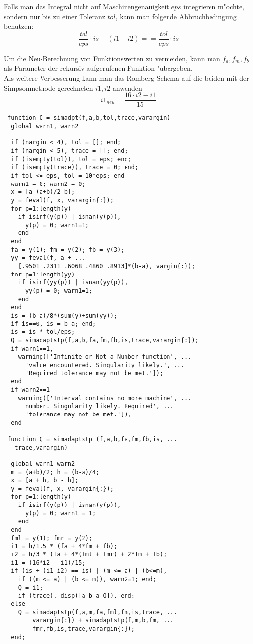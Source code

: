 \documentclass[german, 10pt, a4paper, twocolumn]{scrartcl}
\theoremstyle{definition}
\begin{document}
Falls man das Integral nicht auf Maschinengenauigkeit $eps$ integrieren m"ochte, sondern nur bis zu einer Toleranz $tol$, kann man folgende Abbruchbedingung benutzen:
\begin{displaymath}
	\frac{tol}{eps} \cdotp is + (i1-i2) == \frac{tol}{eps} \cdotp is
\end{displaymath}

Um die Neu-Berechnung von Funktionswerten zu vermeiden, kann man $f_a, f_m, f_b$ als Parameter der rekursiv aufgerufenen Funktion "ubergeben.\\

Als weitere Verbesserung kann man das Romberg-Schema auf die beiden mit der Simpsonmethode gerechneten $i1, i2$ anwenden
\begin{displaymath}
	i1_{neu} = \frac{16\cdotp i2 - i1}{15}
\end{displaymath}

\small
\begin{verbatim}
 function Q = simadpt(f,a,b,tol,trace,varargin)
  global warn1, warn2

  if (nargin < 4), tol = []; end;
  if (nargin < 5), trace = []; end;
  if (isempty(tol)), tol = eps; end;
  if (isempty(trace)), trace = 0; end;
  if tol <= eps, tol = 10*eps; end
  warn1 = 0; warn2 = 0;
  x = [a (a+b)/2 b];
  y = feval(f, x, varargin{:});
  for p=1:length(y)
    if isinf(y(p)) | isnan(y(p)),
      y(p) = 0; warn1=1;
    end
  end
  fa = y(1); fm = y(2); fb = y(3);
  yy = feval(f, a + ...
    [.9501 .2311 .6068 .4860 .8913]*(b-a), vargin{:});
  for p=1:length(yy)
    if isinf(yy(p)) | isnan(yy(p)),
      yy(p) = 0; warn1=1;
    end
  end
  is = (b-a)/8*(sum(y)+sum(yy));
  if is==0, is = b-a; end;
  is = is * tol/eps;
  Q = simadaptstp(f,a,b,fa,fm,fb,is,trace,varargin{:});
  if warn1==1,
    warning(['Infinite or Not-a-Number function', ...
      'value encountered. Singularity likely.', ...
      'Required tolerance may not be met.']);
  end
  if warn2==1
    warning(['Interval contains no more machine', ...
      number. Singularity likely. Required', ...
      'tolerance may not be met.']);
  end

 function Q = simadaptstp (f,a,b,fa,fm,fb,is, ...
   trace,varargin)

  global warn1 warn2
  m = (a+b)/2; h = (b-a)/4;
  x = [a + h, b - h];
  y = feval(f, x, varargin{:});
  for p=1:length(y)
    if isinf(y(p)) | isnan(y(p)),
      y(p) = 0; warn1 = 1;
    end
  end
  fml = y(1); fmr = y(2);
  i1 = h/1.5 * (fa + 4*fm + fb);
  i2 = h/3 * (fa + 4*(fml + fmr) + 2*fm + fb);
  i1 = (16*i2 - i1)/15;
  if (is + (i1-i2) == is) | (m <= a) | (b<=m),
    if ((m <= a) | (b <= m)), warn2=1; end;
    Q = i1;
    if (trace), disp([a b-a Q]), end;
  else
    Q = simadaptstp(f,a,m,fa,fml,fm,is,trace, ...
        varargin{:}) + simadaptstp(f,m,b,fm, ...
        fmr,fb,is,trace,varargin{:});
  end;
\end{verbatim}
\normalsize
\end{document}
